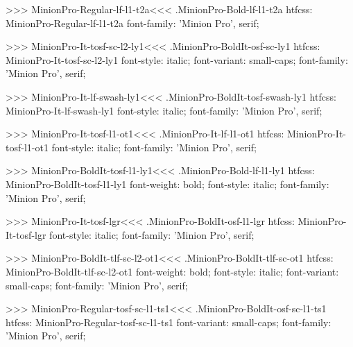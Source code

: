 {>>>
\<MinionPro-Regular-lf-l1-t2a\><<<
.MinionPro-Bold-lf-l1-t2a
htfcss:  MinionPro-Regular-lf-l1-t2a  font-family: 'Minion Pro', serif;

>>>
\<MinionPro-It-tosf-sc-l2-ly1\><<<
.MinionPro-BoldIt-osf-sc-ly1
htfcss:  MinionPro-It-tosf-sc-l2-ly1  font-style: italic; font-variant: small-caps; font-family: 'Minion Pro', serif;

>>>
\<MinionPro-It-lf-swash-ly1\><<<
.MinionPro-BoldIt-tosf-swash-ly1
htfcss:  MinionPro-It-lf-swash-ly1  font-style: italic; font-family: 'Minion Pro', serif;

>>>
\<MinionPro-It-tosf-l1-ot1\><<<
.MinionPro-It-lf-l1-ot1
htfcss:  MinionPro-It-tosf-l1-ot1  font-style: italic; font-family: 'Minion Pro', serif;

>>>
\<MinionPro-BoldIt-tosf-l1-ly1\><<<
.MinionPro-Bold-lf-l1-ly1
htfcss:  MinionPro-BoldIt-tosf-l1-ly1  font-weight: bold; font-style: italic; font-family: 'Minion Pro', serif;

>>>
\<MinionPro-It-tosf-lgr\><<<
.MinionPro-BoldIt-osf-l1-lgr
htfcss:  MinionPro-It-tosf-lgr  font-style: italic; font-family: 'Minion Pro', serif;

>>>
\<MinionPro-BoldIt-tlf-sc-l2-ot1\><<<
.MinionPro-BoldIt-tlf-sc-ot1
htfcss:  MinionPro-BoldIt-tlf-sc-l2-ot1  font-weight: bold; font-style: italic; font-variant: small-caps; font-family: 'Minion Pro', serif;

>>>
\<MinionPro-Regular-tosf-sc-l1-ts1\><<<
.MinionPro-BoldIt-osf-sc-l1-ts1
htfcss:  MinionPro-Regular-tosf-sc-l1-ts1  font-variant: small-caps; font-family: 'Minion Pro', serif;

}
